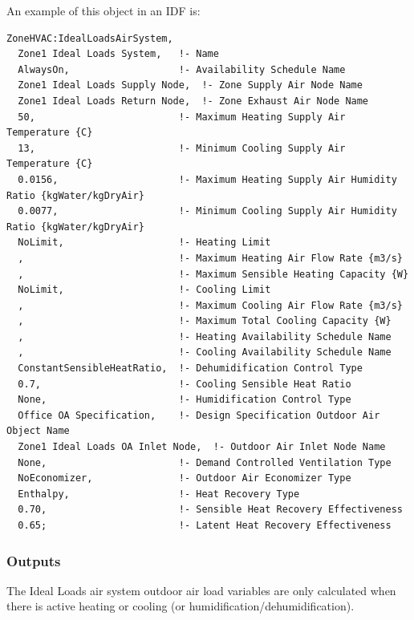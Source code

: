 An example of this object in an IDF is:

\begin{lstlisting}
ZoneHVAC:IdealLoadsAirSystem,
  Zone1 Ideal Loads System,   !- Name
  AlwaysOn,                   !- Availability Schedule Name
  Zone1 Ideal Loads Supply Node,  !- Zone Supply Air Node Name
  Zone1 Ideal Loads Return Node,  !- Zone Exhaust Air Node Name
  50,                         !- Maximum Heating Supply Air Temperature {C}
  13,                         !- Minimum Cooling Supply Air Temperature {C}
  0.0156,                     !- Maximum Heating Supply Air Humidity Ratio {kgWater/kgDryAir}
  0.0077,                     !- Minimum Cooling Supply Air Humidity Ratio {kgWater/kgDryAir}
  NoLimit,                    !- Heating Limit
  ,                           !- Maximum Heating Air Flow Rate {m3/s}
  ,                           !- Maximum Sensible Heating Capacity {W}
  NoLimit,                    !- Cooling Limit
  ,                           !- Maximum Cooling Air Flow Rate {m3/s}
  ,                           !- Maximum Total Cooling Capacity {W}
  ,                           !- Heating Availability Schedule Name
  ,                           !- Cooling Availability Schedule Name
  ConstantSensibleHeatRatio,  !- Dehumidification Control Type
  0.7,                        !- Cooling Sensible Heat Ratio
  None,                       !- Humidification Control Type
  Office OA Specification,    !- Design Specification Outdoor Air Object Name
  Zone1 Ideal Loads OA Inlet Node,  !- Outdoor Air Inlet Node Name
  None,                       !- Demand Controlled Ventilation Type
  NoEconomizer,               !- Outdoor Air Economizer Type
  Enthalpy,                   !- Heat Recovery Type
  0.70,                       !- Sensible Heat Recovery Effectiveness
  0.65;                       !- Latent Heat Recovery Effectiveness
\end{lstlisting}

\subsubsection{Outputs}\label{outputs-043}

The Ideal Loads air system outdoor air load variables are only calculated when there is active heating or cooling (or humidification/dehumidification).

